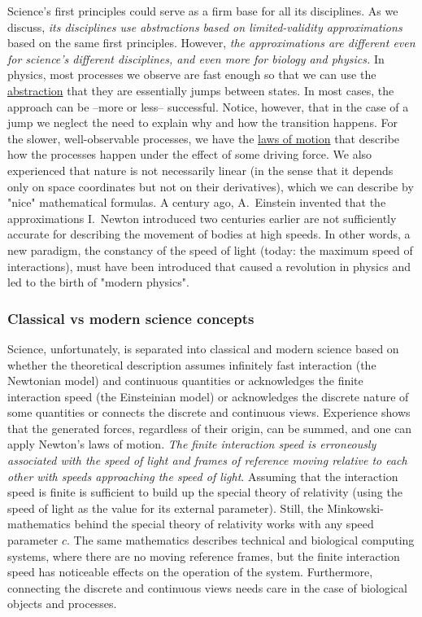  Science's first principles could serve as a firm base for all its disciplines.
As we discuss, \textit{its disciplines use abstractions based on limited-validity approximations} based on the same first principles.
However, \textit{the approximations are different even for 
science's different disciplines, and even more for biology and physics.}
In physics, most processes we observe are fast enough so that we can use the \hyperlink{Abstractions}
{abstraction} that they are essentially jumps between states.
In most cases, the approach can be --more or less-- successful. Notice, however, that in the case of a jump
we neglect the need to explain why and how the transition happens.
For the slower, well-observable processes,
we have the \hyperlink{PhysicsLawsOfMotion}
{laws of motion}
that describe how the processes happen under the effect of some driving force.
We also experienced that nature is not necessarily linear (in the sense that it depends only on space coordinates but not on their derivatives), which we can describe by "nice" mathematical formulas.
A century ago, A.~Einstein invented that the approximations I.~Newton introduced two centuries earlier are not sufficiently accurate for describing the movement of bodies at high speeds. In other words, a new paradigm, the constancy of the speed of light (today: the maximum speed
of interactions), must have been introduced
that caused a revolution in physics and led to the birth of "modern physics". 
%
 
 \subsubsection{Classical vs modern science concepts\label{sec:Physics-ClassicalVsModernScienceConcepts}}

Science, unfortunately, is separated into classical and modern science based on whether the theoretical description assumes infinitely fast interaction (the Newtonian model) and continuous quantities or acknowledges the finite interaction speed (the Einsteinian model) or acknowledges the discrete nature of some quantities or connects the discrete and continuous views. Experience shows that the generated forces, regardless of their origin, can be summed, and one can apply
Newton's laws of motion.
\textit{The finite interaction speed
is erroneously associated with the speed of light and frames of reference
moving relative to each other with speeds approaching the speed of
light}. Assuming that the interaction speed is finite  is sufficient to
build up the special theory of relativity \cite{ModernRelativity:1993} (using the speed
of light as the value for its external parameter).
Still, the Minkowski-mathematics \cite{Minkowski:1908} behind the
special theory of relativity works with any speed parameter $c$.
The same mathematics describes technical \cite{VeghRevisingClassicComputing:2021}
and biological \cite{RoleOfInformationTransferSpeed:2022} computing
systems, where there are no moving reference frames, but the finite
interaction speed has noticeable effects on the operation of the system.
Furthermore, connecting the discrete and continuous views needs care
in the case of biological objects and processes.



